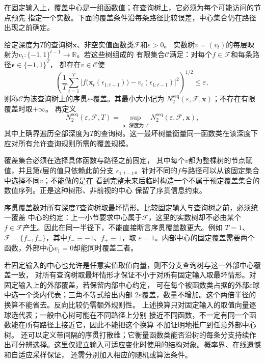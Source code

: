 在固定输入上，覆盖中心是一组函数值；在查询树上，它必须为每个可能访问的节点预先
指定一个实数。下面的覆盖条件沿每条路径比较误差，中心集合仍在路径出现之前确定。
\begin{definition}[序贯覆盖与序贯覆盖数]
\label{def:functional-sequential-cover}
给定深度为$T$的查询树$\bm x$、非空实值函数类$\mathcal F$和$\varepsilon>0$。
实数树$v=(v_t)$的每层映射为$v_t:\{-1,1\}^{t-1}\to\mathbb R$。若这些树组成的
有限集合$\mathcal C$满足：对每个$f\in\mathcal F$和每条路径$\bm\epsilon\in\{-1,1\}^T$，
都存在$v\in\mathcal C$使
\begin{equation}
  \left(
    \frac1T\sum_{t=1}^{T}
    \left|
      f\bigl(\bm{x}_t(\epsilon_{1:t-1})\bigr)
      -
      v_t(\epsilon_{1:t-1})
    \right|^2
  \right)^{1/2}
  \leq\varepsilon,
  \label{eq:functional-sequential-cover}
\end{equation}
则称$\mathcal C$为该查询树上的序贯$\varepsilon$-覆盖。其最小大小记为
$N_2^{\mathrm{seq}}(\varepsilon,\mathcal F,\bm x)$；不存在有限覆盖时取$+\infty$。
再定义
\[
 N_2^{\mathrm{seq}}(\varepsilon,\mathcal F,T)
 =\sup_{\bm x:\,\text{深度为 }T}
 N_2^{\mathrm{seq}}(\varepsilon,\mathcal F,\bm x),
\]
其中上确界遍历全部深度为$T$的查询树。这一最坏树量衡量同一函数类在该深度下
应对所有允许查询规则所需的覆盖规模。
\end{definition}
覆盖集合必须在选择具体函数与路径之前固定，
其中每个$v$都为整棵树的节点赋值，并且第$t$层的值只依赖此前分支
$\epsilon_{1:t-1}$。针对不同的$f$与路径可以从该固定集合中选择不同$v$；不能做的是在
看到完整未来后临时构造一个不属于预定覆盖集合的数值序列。正是这种树形、非前视的中心
保留了序贯信息约束。

序贯覆盖数对所有深度$T$查询树取最坏情形。比较固定输入与查询树之前，必须统一覆盖
中心的约定：上一小节要求中心属于$\mathcal F$，这里的实数树却不必由某个
$f\in\mathcal F$产生。因此在同一半径下，不能直接断言序贯覆盖数更大。例如
$T=1$、$\mathcal F=\{f_-,f_+\}$，其中$f_-\equiv-1$、$f_+\equiv1$，取
$\varepsilon=1$。内部中心的固定覆盖需要两个函数，外部中心$v_1=0$却能同时覆盖二者。

若固定输入的中心也允许是任意实值取值向量，则不分支查询树与这一外部中心覆盖一致，
对所有查询树取最坏情形才保证不小于对所有固定输入取最坏情形。对固定输入上的外部覆盖，若保留内部中心约定，
可在每个被函数类占据的外部$\varepsilon$球中选一个类内代表；三角不等式给出内部
$2\varepsilon$覆盖，数量不增加。这个两倍半径的换算不能省去。反向比较仍需额外规则性。
上述换算只对固定输入的取值向量逐球选代表；一般中心树可能在不同路径上分别
接近不同函数，不一定有同一个函数能在所有路径上接近它，因此不能把这个换算
不加证明地推广到任意外部中心树。
还可以定义带间隔的序贯打散维；它衡量函数类能否沿树的每条分支持续作出可分辨选择。这里仅建立输入可适应变化时使用的结构对象。概率界、在线遗憾和自适应采样保证，
还需分别加入相应的随机或算法条件。

